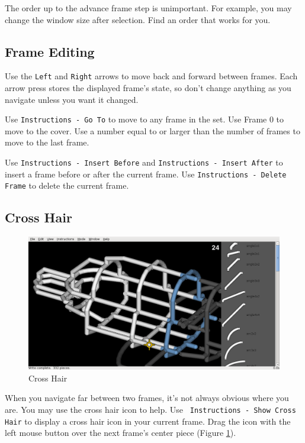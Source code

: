 \documentclass[12pt]{report}
\begin{document}
The order up to the advance frame step is unimportant.  For example,
you may change the window size after selection.  Find an order that
works for you.

\subsection{Frame Editing}

Use the {\tt Left} and {\tt Right} arrows to move back and forward
between frames.  Each arrow press stores the displayed frame's state,
so don't change anything as you navigate unless you want it changed.

Use {\tt Instructions - Go To} to move to any frame in the set.
Use Frame 0 to move to the cover.  Use a number equal to or larger
than the number of frames to move to the last frame.

Use {\tt Instructions - Insert Before} and {\tt Instructions - Insert
  After} to insert a frame before or after the current frame.  Use
{\tt Instructions - Delete Frame} to delete the current frame.

\subsection{Cross Hair}

\begin{figure}[H]
\begin{center}
\includegraphics[width=5.38in]{doc_images/manual_instructions_xhair.png}
\caption{Cross Hair}
\label{InstructionsXhair}
\end{center}
\end{figure}

When you navigate far between two frames, it's not always obvious
where you are.  You may use the cross hair icon to help.  Use {\tt
  Instructions - Show Cross Hair} to display a cross hair icon in your
current frame.  Drag the icon with the left mouse button over the next
frame's center piece (Figure \ref{InstructionsXhair}).
\end{document}
